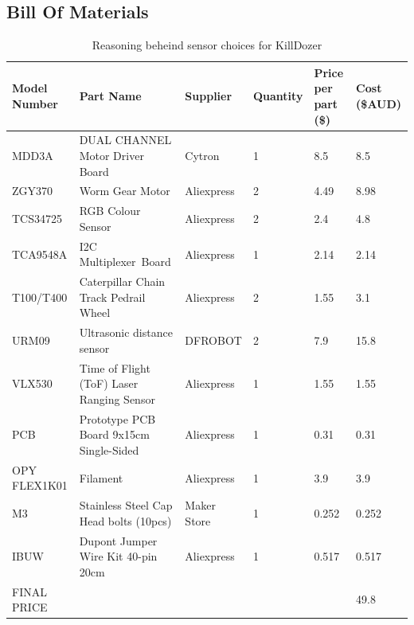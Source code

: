 \documentclass[11pt]{article}
\begin{document}
\subsection*{Bill Of Materials}
\label{sec:org6fe6ef0}
\begin{table}[htbp]
\caption{Reasoning beheind sensor choices for KillDozer}
\centering
    \begin{tabularx}{\textwidth}{|X|X|X|X|X|X|}
    \hline
        \rowcolor{CtpOverlay1}
 \textbf{Model Number} & \textbf{Part Name} & \textbf{Supplier} & \textbf{Quantity} & \textbf{Price per part (\$)} & \textbf{Cost (\$AUD)} \\ \hline
        MDD3A  & DUAL CHANNEL Motor Driver Board & Cytron & 1 & 8.5 & 8.5 \\ \hline
        ZGY370 & Worm Gear Motor & Aliexpress  & 2 & 4.49 & 8.98 \\ \hline
        TCS34725 & RGB Colour Sensor  & Aliexpress  & 2 & 2.4 & 4.8 \\ \hline
        TCA9548A & I2C Multiplexer Board  & Aliexpress  & 1 & 2.14 & 2.14 \\ \hline
        T100/T400  & Caterpillar Chain Track Pedrail Wheel  & Aliexpress  & 2 & 1.55 & 3.1 \\ \hline
        URM09  & Ultrasonic distance sensor  & DFROBOT & 2 & 7.9 & 15.8 \\ \hline
        VLX530 & Time of Flight (ToF) Laser Ranging Sensor & Aliexpress  & 1 & 1.55 & 1.55 \\ \hline
        PCB & Prototype PCB Board 9x15cm Single-Sided  & Aliexpress  & 1 & 0.31 & 0.31 \\ \hline
        OPY FLEX1K01 & Filament  & Aliexpress  & 1 & 3.9 & 3.9 \\ \hline
        M3 & Stainless Steel Cap Head bolts (10pcs) & Maker Store  & 1 & 0.252 & 0.252 \\ \hline
        IBUW & Dupont Jumper Wire Kit 40-pin 20cm & Aliexpress  & 1 & 0.517 & 0.517 \\ \hline
        \rowcolor{CtpOverlay1} FINAL PRICE & ~ & ~ & ~ & ~ & 49.8 \\ \hline
    \end{tabularx}
\end{table}
\end{document}
